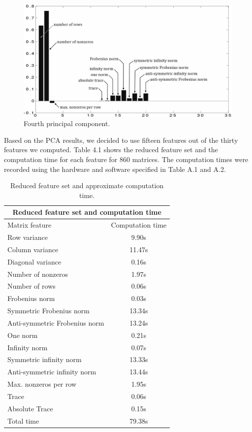 \begin{figure}[H]\label{pc_4l}
  \centering
  \includegraphics[width=6in]{figs/pc_4l}
  \caption[Fourth principal component.]
   {Fourth principal component.}
\end{figure}

\noindent Based on the PCA results, we decided to use fifteen features out of the thirty features we computed. Table 4.1 shows the reduced feature set and the computation time for each feature for 860 matrices. The computation times were recorded using the hardware and software specified in Table A.1 and A.2.

\begin{table}[H]
 \centering
    \begin{tabular}{| l | c |}
    \hline
    \multicolumn{2}{|c|}{Reduced feature set and computation time} \\
    \hline
    \hline
    Matrix feature & Computation time \\ \hline
    Row variance & 9.90s \\ \hline
    Column variance & 11.47s \\ \hline
    Diagonal variance & 0.16s  \\ \hline
    Number of nonzeros & 1.97s  \\ \hline
    Number of rows & 0.06s \\ \hline
    Frobenius norm & 0.03s  \\ \hline
    Symmetric Frobenius norm & 13.34s  \\ \hline
    Anti-symmetric Frobenius norm & 13.24s  \\ \hline
    One norm &  0.21s \\ \hline
    Infinity norm & 0.07s \\ \hline
    Symmetric infinity norm & 13.33s \\ \hline
    Anti-symmetric infinity norm & 13.44s \\ \hline
    Max. nonzeros per row & 1.95s \\ \hline
    Trace & 0.06s  \\ \hline
    Absolute Trace & 0.15s \\ \hline
    \hline
    Total time & 79.38s \\ \hline
   \end{tabular}
   \caption{Reduced feature set and approximate computation time.}
   \label{tab:featureset}
\end{table}

